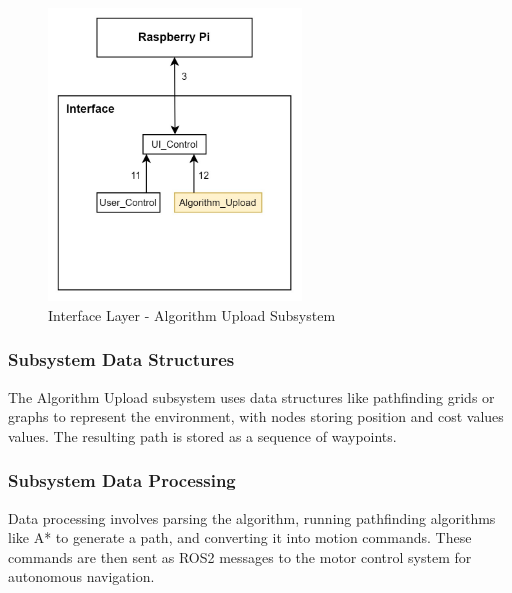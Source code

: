\begin{figure}[h!]
	\centering
 	\includegraphics[width=0.60\textwidth]{images/interface/3_algorithm.jpg}
 \caption{Interface Layer - Algorithm Upload Subsystem}
\end{figure}

\subsubsection{Subsystem Data Structures}
The Algorithm Upload subsystem uses data structures like pathfinding grids or graphs to represent the environment, with nodes storing position and cost values values. The resulting path is stored as a sequence of waypoints.

\subsubsection{Subsystem Data Processing}
Data processing involves parsing the algorithm, running pathfinding algorithms like A* to generate a path, and converting it into motion commands. These commands are then sent as ROS2 messages to the motor control system for autonomous navigation.
